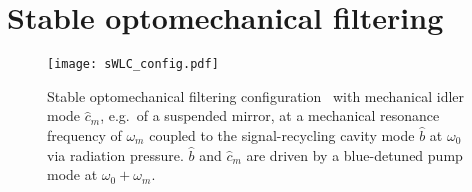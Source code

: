 


\section{Stable optomechanical filtering}
\label{sec:sWLC}

\begin{figure}[ht]
	\centering
	\texttt{[image: sWLC\_config.pdf]}
	\caption{ Stable optomechanical filtering configuration~\cite{liEnhancingInterferometerSensitivity2021} with mechanical idler mode $\hat{c}_m$, e.g.\ of a suspended mirror, at a mechanical resonance frequency of $\omega_m$ coupled to the signal-recycling cavity mode $\hat b$ at $\omega_0$ via radiation pressure. $\hat b$ and $\hat{c}_m$ are driven by a blue-detuned pump mode at $\omega_0+\omega_m$.}
	\label{fig:sWLC_config}
\end{figure}



